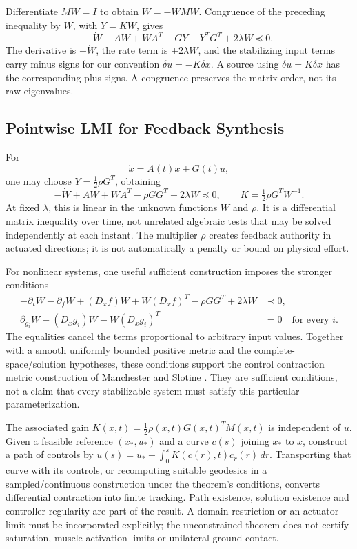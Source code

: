 Differentiate $MW=I$ to obtain $\dot W=-W\dot MW$. Congruence of the preceding inequality by $W$, with $Y=KW$, gives
\begin{equation}
-\dot W+AW+WA^T-GY-Y^TG^T+2\lambda W\preceq0.
\label{eq:ch4:W-space-LMI}
\end{equation}
The derivative is $-\dot W$, the rate term is $+2\lambda W$, and the stabilizing input terms carry minus signs for our convention $\delta u=-K\delta x$. A source using $\delta u=K\delta x$ has the corresponding plus signs. A congruence preserves the matrix order, not its raw eigenvalues.

\subsection{Pointwise LMI for Feedback Synthesis}

For
\begin{equation}
\dot x=A(t)x+G(t)u,
\label{eq:ch4:LTV-system}
\end{equation}
one may choose $Y=\tfrac12\rho G^T$, obtaining
\begin{equation}
-\dot W+AW+WA^T-\rho GG^T+2\lambda W\preceq0,\qquad
K=\tfrac12\rho G^TW^{-1}.
\label{eq:ch4:pointwise-LMI}
\end{equation}
At fixed $\lambda$, this is linear in the unknown functions $W$ and $\rho$. It is a differential matrix inequality over time, not unrelated algebraic tests that may be solved independently at each instant. The multiplier $\rho$ creates feedback authority in actuated directions; it is not automatically a penalty or bound on physical effort.

For nonlinear systems, one useful sufficient construction imposes the stronger conditions
\begin{align}
-\partial_tW-\partial_fW+(D_xf)W+W(D_xf)^T
-\rho GG^T+2\lambda W&\prec0,\\
\partial_{g_i}W-(D_xg_i)W-W(D_xg_i)^T&=0\quad\text{for every }i.
\end{align}
The equalities cancel the terms proportional to arbitrary input values. Together with a smooth uniformly bounded positive metric and the complete-space/solution hypotheses, these conditions support the control contraction metric construction of Manchester and Slotine \cite{ManchesterSlotine2017}. They are sufficient conditions, not a claim that every stabilizable system must satisfy this particular parameterization.

The associated gain $K(x,t)=\tfrac12\rho(x,t)G(x,t)^TM(x,t)$ is independent of $u$. Given a feasible reference $(x_*,u_*)$ and a curve $c(s)$ joining $x_*$ to $x$, construct a path of controls by
$u(s)=u_*-\int_0^sK(c(r),t)c_r(r)\,dr$.
Transporting that curve with its controls, or recomputing suitable geodesics in a sampled/continuous construction under the theorem's conditions, converts differential contraction into finite tracking. Path existence, solution existence and controller regularity are part of the result. A domain restriction or an actuator limit must be incorporated explicitly; the unconstrained theorem does not certify saturation, muscle activation limits or unilateral ground contact.

